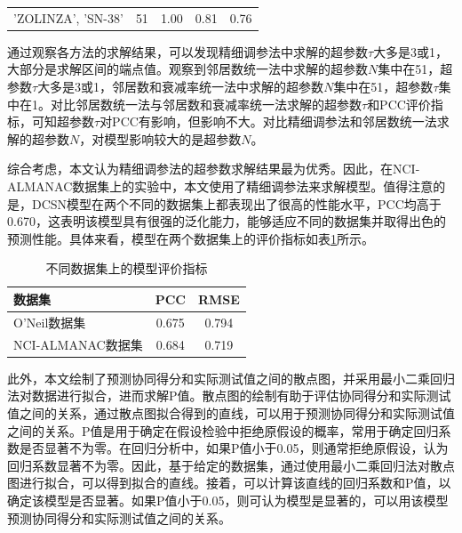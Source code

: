 \begin{center}
\begin{longtable}{@{}lcccc@{}}
    'ZOLINZA', 'SN-38' & 51 & 1.00 & 0.81 & 0.76 \\
\end{longtable}
\end{center}

通过观察各方法的求解结果，可以发现精细调参法中求解的超参数$τ$大多是3或1，大部分是求解区间的端点值。观察到邻居数统一法中求解的超参数$N$集中在51，超参数$τ$大多是3或1，邻居数和衰减率统一法中求解的超参数$N$集中在51，超参数$τ$集中在1。对比邻居数统一法与邻居数和衰减率统一法求解的超参数$τ$和PCC评价指标，可知超参数$τ$对PCC有影响，但影响不大。对比精细调参法和邻居数统一法求解的超参数$N$，对模型影响较大的是超参数$N$。

综合考虑，本文认为精细调参法的超参数求解结果最为优秀。因此，在NCI-ALMANAC数据集上的实验中，本文使用了精细调参法来求解模型。值得注意的是，DCSN模型在两个不同的数据集上都表现出了很高的性能水平，PCC均高于0.670，这表明该模型具有很强的泛化能力，能够适应不同的数据集并取得出色的预测性能。具体来看，模型在两个数据集上的评价指标如表\ref{table:model-mn}所示。

\begin{table}[htbp]
  \centering
  \caption{不同数据集上的模型评价指标}
  \label{table:model-mn}
  \small
  \begin{tabular}{p{5cm}cc}
    \toprule
    数据集 & PCC & RMSE \\
    \midrule
    O'Neil数据集 & 0.675 & 0.794 \\
    NCI-ALMANAC数据集 & 0.684 & 0.719 \\
    \bottomrule
  \end{tabular}
\end{table}

此外，本文绘制了预测协同得分和实际测试值之间的散点图，并采用最小二乘回归法对数据进行拟合，进而求解P值。散点图的绘制有助于评估协同得分和实际测试值之间的关系，通过散点图拟合得到的直线，可以用于预测协同得分和实际测试值之间的关系。P值是用于确定在假设检验中拒绝原假设的概率，常用于确定回归系数是否显著不为零。在回归分析中，如果P值小于0.05，则通常拒绝原假设，认为回归系数显著不为零。因此，基于给定的数据集，通过使用最小二乘回归法对散点图进行拟合，可以得到拟合的直线。接着，可以计算该直线的回归系数和P值，以确定该模型是否显著。如果P值小于0.05，则可认为模型是显著的，可以用该模型预测协同得分和实际测试值之间的关系。

